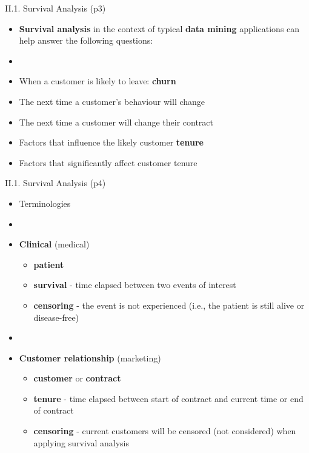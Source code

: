 \documentclass[handout]{beamer}
\newcommand{\strong}[1]{\textbf{\color{teal} #1}}
\newcommand{\stronger}[1]{\textbf{\color{purple} #1}}
\begin{document}
\begin{frame}{II.1. Survival Analysis (p3)}
\begin{itemize}
\item[] \stronger{Survival analysis} in the context of typical \strong{data mining} applications can help answer the following questions:
\item[]
\item When a customer is likely to leave: \stronger{churn}
\item The next time a customer's behaviour will change
\item The next time a customer will change their contract
\item Factors that influence the likely customer \stronger{tenure}
\item Factors that significantly affect customer tenure
\end{itemize}
\end{frame}
\begin{frame}{II.1. Survival Analysis (p4)}
\begin{itemize}
\item[] Terminologies
\item[]
\item \strong{Clinical} (medical)
	\begin{itemize}
	\item \strong{patient}
	\item \stronger{survival} - time elapsed between two events of interest
	\item \stronger{censoring} - the event is not experienced (i.e., the patient is still alive or disease-free)
	\end{itemize}
\item[]
\item \strong{Customer relationship} (marketing)
	\begin{itemize}
	\item \strong{customer} or \strong{contract}
	\item \strong{tenure} - time elapsed between start of contract and current time or end of contract
	\item \strong{censoring} - current customers will be censored (not considered) when applying survival analysis
	\end{itemize}
\end{itemize}
\end{frame}
\end{document}
